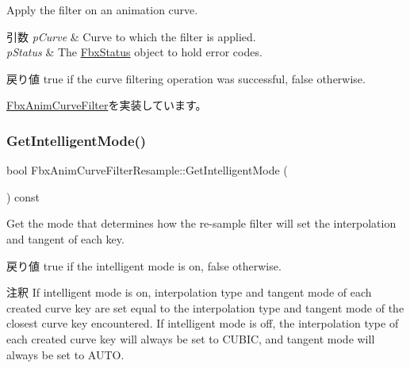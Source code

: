 Apply the filter on an animation curve. 
\begin{DoxyParams}{引数}
{\em p\+Curve} & Curve to which the filter is applied. \\
\hline
{\em p\+Status} & The \hyperlink{class_fbx_status}{Fbx\+Status} object to hold error codes. \\
\hline
\end{DoxyParams}
\begin{DoxyReturn}{戻り値}
{\ttfamily true} if the curve filtering operation was successful, {\ttfamily false} otherwise. 
\end{DoxyReturn}


\hyperlink{class_fbx_anim_curve_filter_a6a69996c47c0e6f63a0f8b0d5fa806a0}{Fbx\+Anim\+Curve\+Filter}を実装しています。

\mbox{\label{class_fbx_anim_curve_filter_resample_ae0b81c640c35b6b2d0a34b5586f2f053}} 
\subsubsection{\texorpdfstring{Get\+Intelligent\+Mode()}{GetIntelligentMode()}}
{\footnotesize\ttfamily bool Fbx\+Anim\+Curve\+Filter\+Resample\+::\+Get\+Intelligent\+Mode (\begin{DoxyParamCaption}{ }\end{DoxyParamCaption}) const}

Get the mode that determines how the re-\/sample filter will set the interpolation and tangent of each key. \begin{DoxyReturn}{戻り値}
{\ttfamily true} if the intelligent mode is on, {\ttfamily false} otherwise. 
\end{DoxyReturn}
\begin{DoxyRemark}{注釈}
If intelligent mode is on, interpolation type and tangent mode of each created curve key are set equal to the interpolation type and tangent mode of the closest curve key encountered. If intelligent mode is off, the interpolation type of each created curve key will always be set to C\+U\+B\+IC, and tangent mode will always be set to A\+U\+TO. 
\end{DoxyRemark}
\mbox{\label{class_fbx_anim_curve_filter_resample_af91489566c2c8445995dd265648646ea}} 
